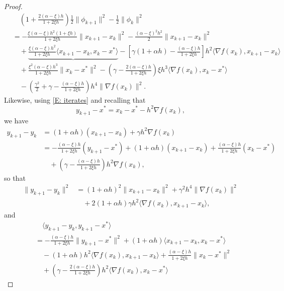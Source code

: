 \documentclass[pdflatex,sn-mathphys-num]{sn-jnl}
\theoremstyle{thmstyleone}
\theoremstyle{thmstyletwo}
\theoremstyle{thmstylethree}
\begin{document}
\begin{appendices}
\begin{proof}
\begin{equation}\label{E: phi_diff_QG}
\begin{aligned}
&\quad \left( 1 + \frac{2(\alpha-\xi) h}{1+2\xi h} \right)\frac{1}{2}\| \phi_{k+1} \|^2 - \frac{1}{2}\| \phi_k \|^2 \\
&= - \frac{\xi(\alpha-\xi) h^2 (1+\xi h )}{1+2\xi h}\| x_{k+1}-x_k \|^2 
   - \frac{(\alpha-\xi)^2 h^2}{2} \| x_{k+1}-x_k \|^2 \\ 
&\quad + \underbrace{ \frac{\xi(\alpha-\xi) h^2}{1+2\xi h} \langle x_{k+1}-x_k, x_k - x^* \rangle }  
  - \left[ \gamma (1+\alpha h) - \frac{(\alpha-\xi) h}{1+2\xi h} \right] h^2 \langle \nabla f(x_k),x_{k+1}-x_k \rangle\\
&\quad + \frac{\xi^2(\alpha-\xi) h^3}{1+2\xi h}\| x_k - x^* \|^2 
   - \left(\gamma - \frac{2(\alpha-\xi) h}{1+2\xi h} \right) \xi h^3\langle \nabla f(x_k), x_k-x^* \rangle \\
&\quad -\left( \frac{\gamma^2}{2} + \gamma - \frac{(\alpha-\xi) h}{1+2\xi h} \right) h^4 \| \nabla f(x_k) \|^2.
\end{aligned}
\end{equation}
Likewise, using \eqref{E: iterates} and recalling that
$$ y_{k+1}-x^* = x_k - x^* - h^2\nabla f(x_k), $$
we have
\begin{align*}
y_{k+1} - y_k
&= (1+\alpha h)(x_{k+1}-x_k) + \gamma h^2 \nabla f(x_k) \\
&= -\frac{(\alpha-\xi) h}{1+2\xi h}(y_{k+1}-x^*)
   + (1+\alpha h)(x_{k+1}-x_k) 
   + \frac{(\alpha-\xi) h}{1+2\xi h}(x_k - x^*) \\
&\quad + \left( \gamma - \frac{(\alpha-\xi) h}{1+2\xi h} \right) h^2 \nabla f(x_k), 
\end{align*}
so that
\begin{align*}
\| y_{k+1} - y_k \|^2
&= (1+\alpha h)^2 \| x_{k+1}-x_k \|^2 + \gamma^2 h^4 \| \nabla f(x_k) \|^2 \\
&\quad + 2(1+\alpha h)\gamma h^2\langle \nabla f(x_k), x_{k+1}-x_k \rangle,
\end{align*}
and
\begin{align*}
&\quad \langle y_{k+1}-y_k, y_{k+1}-x^* \rangle \\  
&= -\frac{(\alpha-\xi) h}{1+2\xi h}\| y_{k+1}-x^* \|^2
  + (1+\alpha h)\langle x_{k+1}-x_k, x_k - x^* \rangle\\
&\quad - (1+\alpha h)h^2 \langle \nabla f(x_k), x_{k+1}-x_k \rangle
  + \frac{(\alpha-\xi) h}{1+2\xi h} \| x_k - x^* \|^2 \\
&\quad + \left( \gamma - \frac{2(\alpha-\xi) h}{1+2\xi h} \right) h^2 \langle \nabla f(x_k), x_k - x^* \rangle   

\end{align*}
\end{proof}
\end{appendices}
\end{document}
